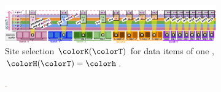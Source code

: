 \begin{figure}[htbp!]
  \flushleft
  \begin{subfigure}[b]{0.972\linewidth}
    \includegraphics[width=\textwidth, trim={0cm 0cm 0.3cm 1cm}, clip]{img/hsurf-steady-intuition}
    \vspace{-4ex}
    \caption{\footnotesize Site selection $\colorK(\colorT)$ for data items of one \hv{}, $\colorH(\colorT) = \colorh$.}
    \label{fig:hsurf-steady-intuition-diagram}
  \end{subfigure}
\vspace{-2ex}
  \flushright
  \begin{subfigure}[b]{0.98\linewidth}
    \includegraphics[width=0.011\textwidth, trim={0.2cm 2.8cm 31.8cm 2.8cm}, clip]{binder/teeplots/11/reservation-mode=steady+surface-size=32+viz=site-reservation-at-ranks-heatmap+ext=.pdf}%
\end{subfigure}
\end{figure}
